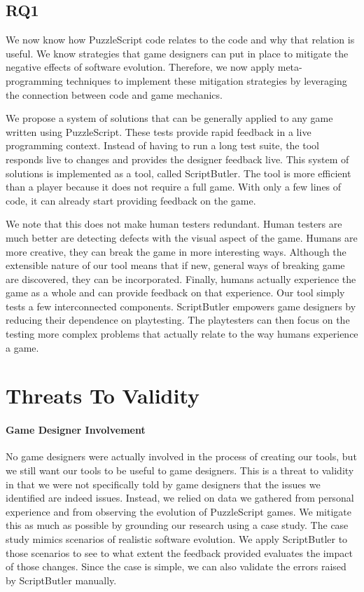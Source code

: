\subsection{RQ1}
We now know how PuzzleScript code relates to the code and why that relation is useful. We know strategies that game designers can put in place to mitigate the negative effects of software evolution. Therefore, we now apply meta-programming techniques to implement these mitigation strategies by leveraging the connection between code and game mechanics. 

We propose a system of solutions that can be generally applied to any game written using PuzzleScript. These tests provide rapid feedback in a live programming context. Instead of having to run a long test suite, the tool responds live to changes and provides the designer feedback live. This system of solutions is implemented as a tool, called ScriptButler. The tool is more efficient than a player because it does not require a full game. With only a few lines of code, it can already start providing feedback on the game.

We note that this does not make human testers redundant. Human testers are much better are detecting defects with the visual aspect of the game. Humans are more creative,  they can break the game in more interesting ways. Although the extensible nature of our tool means that if new, general ways of breaking game are discovered, they can be incorporated. Finally, humans actually experience the game as a whole and can provide feedback on that experience. Our tool simply tests a few interconnected components. ScriptButler empowers game designers by reducing their dependence on playtesting. The playtesters can then focus on the testing more complex problems that actually relate to the way humans experience a game. 

\section{Threats To Validity}
\label{sec:threats}
\paragraph{Game Designer Involvement}
No game designers were actually involved in the process of creating our tools, but we still want our tools to be useful to game designers. This is a threat to validity in that we were not specifically told by game designers that the issues we identified are indeed issues. Instead, we relied on data we gathered from personal experience and from observing the evolution of PuzzleScript games. We mitigate this as much as possible by grounding our research using a case study. The case study mimics scenarios of realistic software evolution. We apply ScriptButler to those scenarios to see to what extent the feedback provided evaluates the impact of those changes. Since the case is simple, we can also validate the errors raised by ScriptButler manually.

